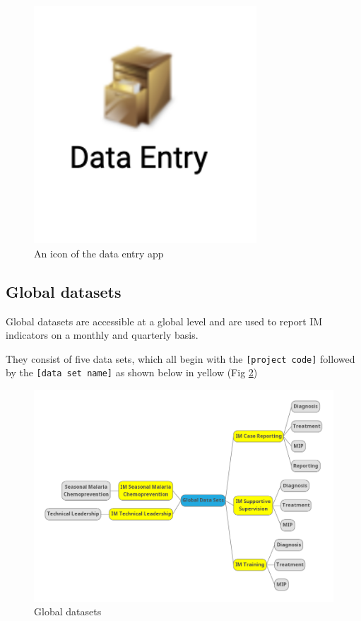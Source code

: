 \documentclass[]{book}
\begin{document}
\begin{figure}
\includegraphics[width=3.28in]{./images/data-entry-app} \caption{An icon of the data entry app}\label{fig:data-entry-app}
\end{figure}

\hypertarget{global-dataset}{%
\subsection{Global datasets}\label{global-dataset}}

Global datasets are accessible at a global level and are used to report IM indicators on a monthly and quarterly basis.

They consist of five data sets, which all begin with the \texttt{{[}project\ code{]}} followed by the \texttt{{[}data\ set\ name{]}} as shown below in yellow (Fig \ref{fig:im-datasets})

\begin{figure}
\includegraphics[width=13.47in]{./images/im datasets} \caption{Global datasets}\label{fig:im-datasets}
\end{figure}
\end{document}
